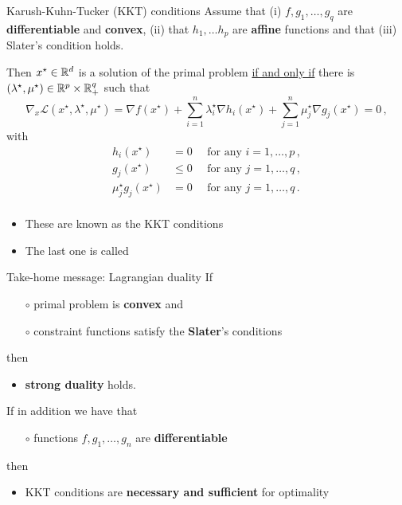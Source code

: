 \documentclass[xcolor={usenames,dvipsnames}]{beamer}
\begin{document}
\begin{frame}{Karush-Kuhn-Tucker (KKT) conditions}
Assume that (i) $f, g_1, \ldots, g_q$ are \textbf{differentiable} and  \textbf{convex}, (ii) that $h_1,\hdots h_p$ are \textbf{affine} functions and that (iii) \alert{Slater's condition} holds.

\vspace{.2cm}
    
Then $x^\star \in \mathbb{R}^d$ is a solution of the primal problem \underline{if and only if} there is $(\lambda^\star, \mu^\star) \in \mathbb{R}^p\times\mathbb{R}_+^q$ such that
$$
      \nabla_x \mathcal{L}(x^\star, \lambda^\star, \mu^\star) = \nabla f(x^\star) 
      + \sum_{i=1}^n \lambda_i^\star \nabla h_i(x^\star) 
      + \sum_{j=1}^n \mu_j^\star \nabla g_j(x^\star) = 0\,,
$$
with
\begin{align*}
      h_i(x^\star) &= 0 \quad \text{ for any } i=1, \ldots, p\,, \\
      g_j(x^\star) &\leq 0 \quad \text{ for any } j=1, \ldots, q\,, \\
      \mu_j^\star g_j(x^\star) &= 0 \quad \text{ for any } j=1, \ldots, q\,. \\
    \end{align*}

\end{frame}



\begin{frame}{}
    \begin{itemize}
    \item These are known as the \alert{KKT conditions}
    \item The last one is called 
  \end{itemize}
  \begin{block}{Take-home message: Lagrangian duality}
 If
  \begin{itemize}
    \item[$\circ$] primal problem is \textbf{convex} and
    \item[$\circ$] constraint functions satisfy the \textbf{Slater}'s conditions
  \end{itemize}
  then
  \begin{itemize}
     \item \textbf{strong duality} holds. 
   \end{itemize} 

  \bigskip
  If in addition we have that
  \begin{itemize}
    \item[$\circ$] functions $f, g_1, \ldots, g_n$ are \textbf{differentiable}
  \end{itemize}
  then
  \begin{itemize}
    \item KKT conditions are \textbf{necessary and sufficient} for optimality
  \end{itemize}
  \end{block}
\end{frame}
\end{document}
